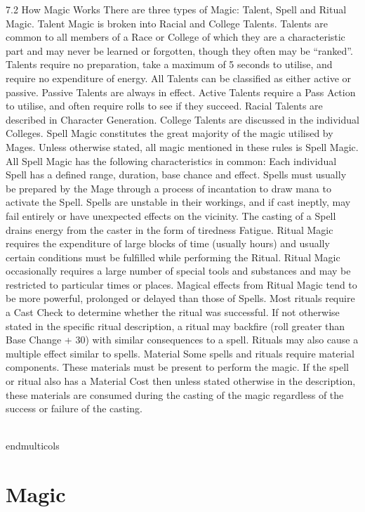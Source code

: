 \documentclass[a4paper]{article}
\begin{document}
\begin{multicols}{3}
7.2 How Magic Works
There are three types of Magic: Talent, Spell and
Ritual Magic.
Talent Magic is broken into Racial and College
Talents. Talents are common to all members of a
Race or College of which they are a characteristic
part and may never be learned or forgotten, though
they often may be “ranked”. Talents require no
preparation, take a maximum of 5 seconds to utilise, and require no expenditure of energy. All
Talents can be classified as either active or passive.
Passive Talents are always in effect. Active Talents
require a Pass Action to utilise, and often require
rolls to see if they succeed. Racial Talents are
described in Character Generation. College Talents
are discussed in the individual Colleges.
Spell Magic constitutes the great majority of the
magic utilised by Mages. Unless otherwise stated,
all magic mentioned in these rules is Spell Magic.
All Spell Magic has the following characteristics in
common:
Each individual Spell has a defined range, duration, base chance and effect. Spells must usually be
prepared by the Mage through a process of incantation to draw mana to activate the Spell. Spells are
unstable in their workings, and if cast ineptly, may
fail entirely or have unexpected effects on the
vicinity. The casting of a Spell drains energy from
the caster in the form of tiredness Fatigue.
Ritual Magic requires the expenditure of large
blocks of time (usually hours) and usually certain
conditions must be fulfilled while performing the
Ritual. Ritual Magic occasionally requires a large
number of special tools and substances and may be
restricted to particular times or places. Magical
effects from Ritual Magic tend to be more powerful, prolonged or delayed than those of Spells.
Most rituals require a Cast Check to determine
whether the ritual was successful. If not otherwise
stated in the specific ritual description, a ritual may
backfire (roll greater than Base Change + 30) with
similar consequences to a spell. Rituals may also
cause a multiple effect similar to spells.
Material
Some spells and rituals require material components. These materials must be present to perform
the magic. If the spell or ritual also has a Material
Cost then unless stated otherwise in the description, these materials are consumed during the casting of the magic regardless of the success or failure
of the casting.

\\end{multicols}

\section{Magic}


\end{multicols}
\end{document}

